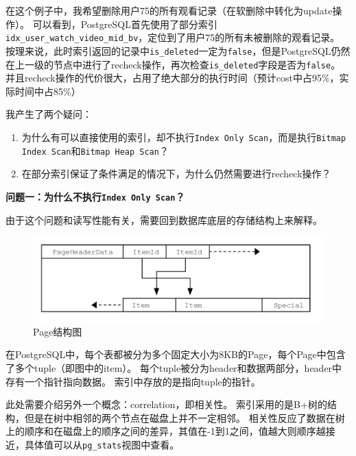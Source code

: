 \documentclass[a4paper,10pt]{ctexart}
\begin{document}
在这个例子中，我希望删除用户75的所有观看记录（在软删除中转化为update操作）。
可以看到，PostgreSQL首先使用了部分索引\texttt{idx\_user\_watch\_video\_mid\_bv}，定位到了用户75的所有未被删除的观看记录。
按理来说，此时索引返回的记录中\texttt{is\_deleted}一定为\texttt{false}，但是PostgreSQL仍然在上一级的节点中进行了recheck操作，再次检查\texttt{is\_deleted}字段是否为\texttt{false}。
并且recheck操作的代价很大，占用了绝大部分的执行时间（预计cost中占95\%，实际时间中占85\%）

我产生了两个疑问：
\begin{enumerate}
    \item 为什么有可以直接使用的索引，却不执行\texttt{Index Only Scan}，而是执行\texttt{Bitmap Index Scan}和\texttt{Bitmap Heap Scan}？
    \item 在部分索引保证了条件满足的情况下，为什么仍然需要进行recheck操作？
\end{enumerate}

\textbf{问题一：为什么不执行\texttt{Index Only Scan}？}

由于这个问题和读写性能有关，需要回到数据库底层的存储结构上来解释。

\begin{figure}[H]
    \centering
    \includegraphics[width=\linewidth]{pagelayout.png}
    \caption{Page结构图\protect\footnotemark} 
\end{figure}

在PostgreSQL中，每个表都被分为多个固定大小为8KB的Page，每个Page中包含了多个tuple（即图中的item）。
每个tuple被分为header和数据两部分，header中存有一个指针指向数据。
索引中存放的是指向tuple的指针。

此处需要介绍另外一个概念：correlation，即相关性。
索引采用的是B+树的结构，但是在树中相邻的两个节点在磁盘上并不一定相邻。
相关性反应了数据在树上的顺序和在磁盘上的顺序之间的差异，其值在-1到1之间，值越大则顺序越接近，具体值可以从\texttt{pg\_stats}视图中查看。
\end{document}
